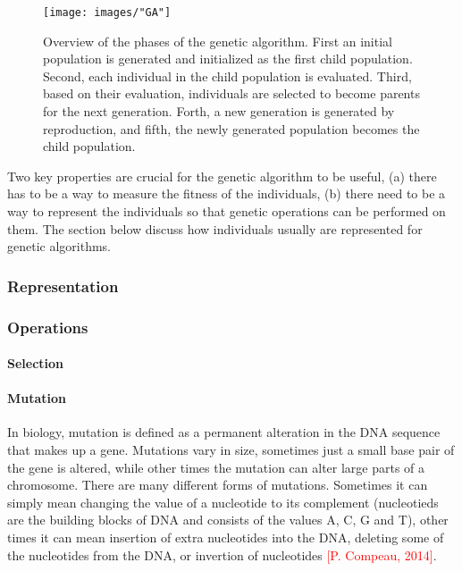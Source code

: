 \documentclass{article}
\begin{document}
\begin{figure}[h!]
\begin{center}
\texttt{[image: images/"GA"]}
\caption{Overview of the phases of the genetic algorithm. First an initial population is generated and initialized as the first child population. Second, each individual in the child population is evaluated. Third, based on their evaluation, individuals are selected to become parents for the next generation. Forth, a new generation is generated by reproduction, and fifth, the newly generated population becomes the child population.}
\label{GA}
\end{center}
\end{figure}


\noindent Two key properties are crucial for the genetic algorithm to be useful, (a) there has to be a way to measure the fitness of the individuals, (b) there need to be a way to represent the individuals so that genetic operations can be performed on them. The section below discuss how individuals usually are represented for genetic algorithms.


\subsubsection{Representation}%


\subsubsection{Operations}


\paragraph{Selection}

\paragraph{Mutation}
In biology, mutation is defined as a permanent alteration in the DNA sequence that makes up a gene. Mutations vary in size, sometimes just a small base pair of the gene is altered, while other times the mutation can alter large parts of a chromosome. There are many different forms of mutations. Sometimes it can simply mean changing the value of a nucleotide to its complement (nucleotieds are the building blocks of DNA and consists of the values A, C, G and T), other times it can mean insertion of extra nucleotides into the DNA, deleting some of the nucleotides from the DNA, or invertion of nucleotides \textcolor{red}{[P. Compeau, 2014]}. \\
\end{document}
